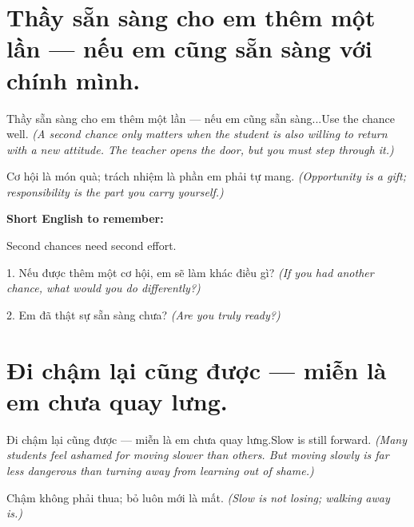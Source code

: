 \section{Thầy sẵn sàng cho em thêm một lần — nếu em cũng sẵn sàng với chính mình.}
\begin{truyen}{Thầy sẵn sàng cho em thêm một lần — nếu em cũng sẵn sàng...}{Use the chance well.}
\textit{(A second chance only matters when the student is also willing to return with a new attitude. The teacher opens the door, but you must step through it.)}
\end{truyen}

\begin{baihoc}
Cơ hội là món quà; trách nhiệm là phần em phải tự mang.
\textit{(Opportunity is a gift; responsibility is the part you carry yourself.)}
\end{baihoc}

\begin{ghinhoanh}
\textbf{Short English to remember:}

Second chances need second effort.

\end{ghinhoanh}

\begin{tuhocnhanh}
1. Nếu được thêm một cơ hội, em sẽ làm khác điều gì? \textit{(If you had another chance, what would you do differently?)}

2. Em đã thật sự sẵn sàng chưa? \textit{(Are you truly ready?)}
\end{tuhocnhanh}
\ngancach


\section{Đi chậm lại cũng được — miễn là em chưa quay lưng.}
\begin{truyen}{Đi chậm lại cũng được — miễn là em chưa quay lưng.}{Slow is still forward.}
\textit{(Many students feel ashamed for moving slower than others. But moving slowly is far less dangerous than turning away from learning out of shame.)}
\end{truyen}

\begin{baihoc}
Chậm không phải thua; bỏ luôn mới là mất.
\textit{(Slow is not losing; walking away is.)}
\end{baihoc}

